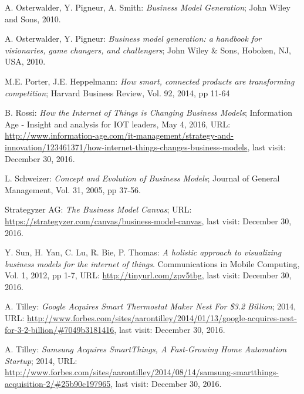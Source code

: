\begin{thebibliography}{99}
	 A. Osterwalder, Y. Pigneur, A. Smith: \emph{Business Model Generation}; John Wiley and Sons, 2010.

	 A. Osterwalder, Y. Pigneur:  \emph{Business model generation: a handbook for visionaries, game changers, and challengers};  John Wiley \& Sons, Hoboken, NJ, USA, 2010.

 	 M.E. Porter, J.E. Heppelmann: \emph{How smart, connected products are transforming competition}; Harvard Business Review, Vol. 92, 2014, pp 11-64
	
	 B. Rossi: \emph{How the Internet of Things is Changing Business Models}; Information Age - Insight and analysis for IOT leaders, May 4, 2016, URL: \url{http://www.information-age.com/it-management/strategy-and-innovation/123461371/how-internet-things-changes-business-models}, last visit: December 30, 2016.

	 L. Schweizer: \emph{Concept and Evolution of Business Models}; Journal of General Management, Vol. 31, 2005, pp 37-56.

	 Strategyzer AG: \emph{The Business Model Canvas}; URL: \url{https://strategyzer.com/canvas/business-model-canvas}, last visit: December 30, 2016.

	 Y. Sun, H. Yan, C. Lu, R. Bie, P. Thomas: \emph{A holistic  approach to visualizing business models for the internet of things}. Communications in Mobile Computing, Vol. 1, 2012, pp 1-7, URL: \url{http://tinyurl.com/zpv5tbg}, last visit: December 30, 2016.
	
 	 A. Tilley: \emph{Google Acquires Smart Thermostat Maker Nest For \$3.2 Billion}; 2014, URL: \url{http://www.forbes.com/sites/aarontilley/2014/01/13/google-acquires-nest-for-3-2-billion/#7049b3181416}, last visit: December 30, 2016.
	
 	  A. Tilley: \emph{Samsung Acquires SmartThings, A Fast-Growing Home Automation Startup}; 2014, URL: \url{http://www.forbes.com/sites/aarontilley/2014/08/14/samsung-smartthings-acquisition-2/#25b90c197965}, last visit: December 30, 2016.


\end{thebibliography}
